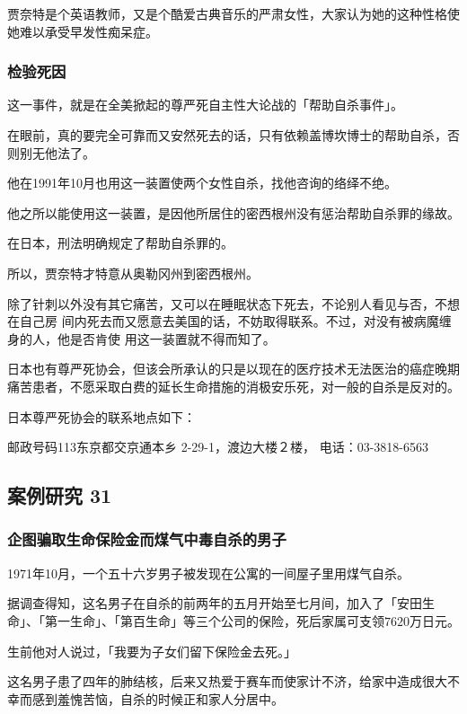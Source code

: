 \documentclass[UTF8]{ctexart}
\begin{document}
贾奈特是个英语教师，又是个酷爱古典音乐的严肃女性，大家认为她的这种性格使她难以承受早发性痴呆症。

\subsubsection*{检验死因}

这一事件，就是在全美掀起的尊严死自主性大论战的「帮助自杀事件」。

在眼前，真的要完全可靠而又安然死去的话，只有依赖盖博坎博士的帮助自杀，否则别无他法了。

他在1991年10月也用这一装置使两个女性自杀，找他咨询的络绎不绝。

他之所以能使用这一装置，是因他所居住的密西根州没有惩治帮助自杀罪的缘故。

在日本，刑法明确规定了帮助自杀罪的。

所以，贾奈特才特意从奥勒冈州到密西根州。

除了针刺以外没有其它痛苦，又可以在睡眠状态下死去，不论别人看见与否，不想在自己房 间内死去而又愿意去美国的话，不妨取得联系。不过，对没有被病魔缠身的人，他是否肯使 用这一装置就不得而知了。

日本也有尊严死协会，但该会所承认的只是以现在的医疗技术无法医治的癌症晚期痛苦患者，不愿采取白费的延长生命措施的消极安乐死，对一般的自杀是反对的。

日本尊严死协会的联系地点如下：

邮政号码113东京都交京通本乡 2-29-1，渡边大楼２楼，
电话：03-3818-6563


\subsection{案例研究 31}

\subsubsection*{企图骗取生命保险金而煤气中毒自杀的男子}

1971年10月，一个五十六岁男子被发现在公寓的一间屋子里用煤气自杀。

据调查得知，这名男子在自杀的前两年的五月开始至七月间，加入了「安田生命」、「第一生命」、「第百生命」等三个公司的保险，死后家属可支领$7620$万日元。

生前他对人说过，「我要为子女们留下保险金去死。」

这名男子患了四年的肺结核，后来又热爱于赛车而使家计不济，给家中造成很大不幸而感到羞愧苦恼，自杀的时候正和家人分居中。
\end{document}
